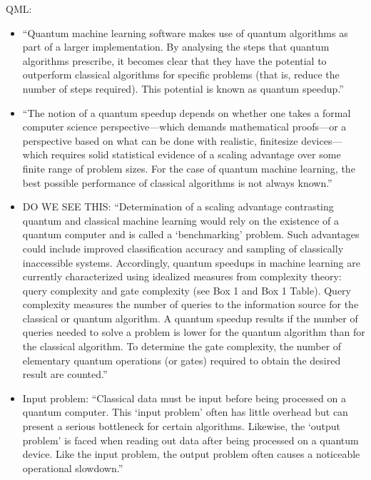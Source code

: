 \documentclass[journal=jacsat,manuscript=article]{achemso}
\begin{document}
QML\cite{biamonte_quantum_2017}:
\begin{itemize}
	\item ``Quantum machine learning software makes use of quantum algorithms as part of a larger implementation. By analysing the steps that quantum algorithms prescribe, it becomes clear that they have the potential to outperform classical algorithms for specific problems (that is, reduce the number of steps required). This potential is known as quantum speedup.''
	\item ``The notion of a quantum speedup depends on whether one takes a formal computer science perspective—which demands mathematical proofs—or a perspective based on what can be done with realistic, finitesize devices—which requires solid statistical evidence of a scaling advantage over some finite range of problem sizes. For the case of quantum machine learning, the best possible performance of classical algorithms is not always known.''
	\item DO WE SEE THIS: ``Determination of a scaling advantage contrasting quantum and classical machine learning would rely on the existence of a quantum computer and is called a ‘benchmarking’ problem. Such advantages could include improved classification accuracy and sampling of classically inaccessible systems. Accordingly, quantum speedups in machine learning are currently characterized using idealized measures from complexity theory: query complexity and gate complexity (see Box 1 and Box 1 Table). Query complexity measures the number of queries to the information source for the classical or quantum algorithm. A quantum speedup results if the number of queries needed to solve a problem is lower for the quantum algorithm than for the classical algorithm. To determine the gate complexity, the number of elementary quantum operations (or gates) required to obtain the desired result are counted.''
	\item Input problem: ``Classical data must be input before being processed on a quantum computer. This ‘input problem’ often has little overhead but can present a serious bottleneck for certain algorithms. Likewise, the ‘output problem’ is faced when reading out data after being processed on a quantum device. Like the input problem, the output problem often causes a noticeable operational slowdown.''

\end{itemize}
\end{document}
